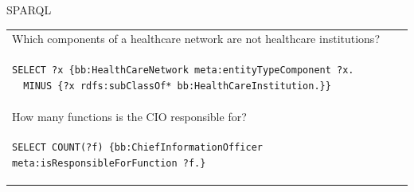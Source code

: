 \documentclass[portrait,final,a0paper,fontscale=0.310]{baposter}
\begin{document}
\begin{poster}
\begin{posterbox}[name=sparql,column=1,above=bottom]{SPARQL}
\vspace{1em}
{
\centering
\begin{tabular*}{\columnwidth}{l}
Which components of a healthcare network are not healthcare institutions?\\
\begin{lstlisting}
SELECT ?x {bb:HealthCareNetwork meta:entityTypeComponent ?x.
  MINUS {?x rdfs:subClassOf* bb:HealthCareInstitution.}}
\end{lstlisting}\\

How many functions is the CIO responsible for?\\
\begin{lstlisting}
SELECT COUNT(?f) {bb:ChiefInformationOfficer meta:isResponsibleForFunction ?f.}
\end{lstlisting}\\


\end{tabular*}}
\end{posterbox}
\end{poster}
\end{document}
